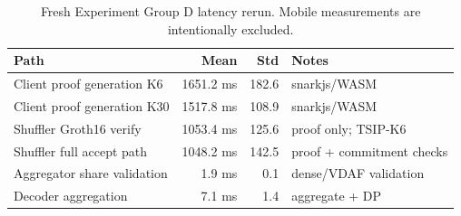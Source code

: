 \begin{table}[t]
\centering
\caption{Fresh Experiment Group D latency rerun. Mobile measurements are intentionally excluded.}
\label{tab:group-d-latency}
\scriptsize
\setlength{\tabcolsep}{3pt}
\begin{tabularx}{\columnwidth}{@{}Y r r Y@{}}
\toprule
Path & Mean & Std & Notes \\
\midrule
Client proof generation K6 & 1651.2 ms & 182.6 & snarkjs/WASM \\
Client proof generation K30 & 1517.8 ms & 108.9 & snarkjs/WASM \\
Shuffler Groth16 verify & 1053.4 ms & 125.6 & proof only; TSIP-K6 \\
Shuffler full accept path & 1048.2 ms & 142.5 & proof + commitment checks \\
Aggregator share validation & 1.9 ms & 0.1 & dense/VDAF validation \\
Decoder aggregation & 7.1 ms & 1.4 & aggregate + DP \\
\bottomrule
\end{tabularx}
\end{table}
